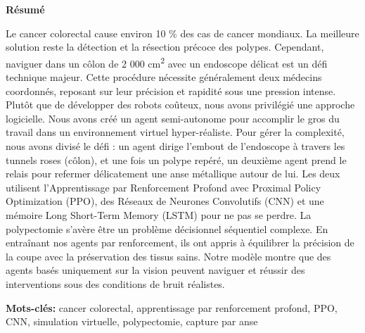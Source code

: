 \clearpage
\begin{center}
\textbf{\Large R\'esum\'e}
\end{center}
\vspace{0.2cm}
\indent Le cancer colorectal cause environ 10 \% des cas de cancer mondiaux. La meilleure solution reste la détection et la résection précoce des polypes. Cependant, naviguer dans un côlon de 2 000 cm\textsuperscript{2} avec un endoscope délicat est un défi technique majeur. Cette procédure nécessite généralement deux médecins coordonnés, reposant sur leur précision et rapidité sous une pression intense. Plutôt que de développer des robots coûteux, nous avons privilégié une approche logicielle. Nous avons créé un agent semi-autonome pour accomplir le gros du travail dans un environnement virtuel hyper-réaliste. Pour gérer la complexité, nous avons divisé le défi : un agent dirige l'embout de l'endoscope à travers les tunnels roses (côlon), et une fois un polype repéré, un deuxième agent prend le relais pour refermer délicatement une anse métallique autour de lui. Les deux utilisent l'Apprentissage par Renforcement Profond avec Proximal Policy Optimization (PPO), des Réseaux de Neurones Convolutifs (CNN) et une mémoire Long Short-Term Memory (LSTM) pour ne pas se perdre. La polypectomie s'avère être un problème décisionnel séquentiel complexe. En entraînant nos agents par renforcement, ils ont appris à équilibrer la précision de la coupe avec la préservation des tissus sains. Notre modèle montre que des agents basés uniquement sur la vision peuvent naviguer et réussir des interventions sous des conditions de bruit réalistes.

\vspace{0.5cm}
\noindent\textbf{Mots-cl\'es:} cancer colorectal, apprentissage par renforcement profond, PPO, CNN, simulation virtuelle, polypectomie, capture par anse

